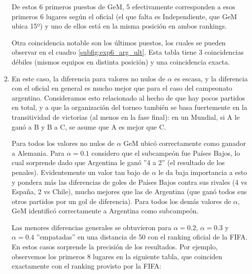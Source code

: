 \begin{enumerate}[parsep=1ex]
        \par De estos 6 primeros puestos de GeM, 5 efectivamente corresponden a
        esos primeros 6 lugares según el oficial (el que falta es Independiente,
        que GeM ubica 15º) y uno de ellos está en la misma posición en ambos
        rankings.

        \par Otra coincidencia notable son los últimos puestos, los cuales se
        pueden observar en el cuadro \ref{subfig:exp6_arg_ult}. Esta tabla tiene
        3 coincidencias débiles (mismos equipos en distinta posición) y una
        coincidencia exacta.\\

    \item En este caso, la diferencia para valores no nulos de $\alpha$ 
        es escasa, y la diferencia con el oficial en general es mucho mejor que
        para el caso del campeonato argentino. Consideramos esto relacionado al
        hecho de que hay pocos partidos en total, y a que la organización del
        torneo también se basa fuertemente en la transitividad de victorias (al
        menos en la fase final): en un Mundial, si A le ganó a B y B a C, se asume que A es
        mejor que C. 
        
        \par Para todos los valores no nulos de $\alpha$ GeM ubicó
        correctamente como ganador a Alemania. Para $\alpha=0.1$ considero que
        el subcampeón fue Países Bajos, lo cual sorprende dado que Argentina le
        ganó ''4 a 2'' (el resultado de los penales). Evidentemente un valor tan
        bajo de $\alpha$ le da baja importancia a esto y pondera más las
        diferencias de goles de Países Bajos contra sus rivales (4 vs España, 2
        vs Chile), mucho mejores que las de Argentina (que ganó todos sus
        otros partidos por un gol de diferencia). Para todos los demás valores de
        $\alpha$, GeM identificó correctamente a Argentina como subcampeón.

        \par Las menores diferencias generales se obtuvieron para $\alpha=0.2$,
        $\alpha=0.3$ y $\alpha=0.4$ ''empatadas'' en una distancia de 50 con el
        ranking oficial de la FIFA. En estos casos sorprende la precisión de los
        resultados. Por ejemplo, observemos los primeros 8 lugares en la
        siguiente tabla, que coinciden exactamente con el ranking provisto por
        la FIFA:


\end{enumerate}
